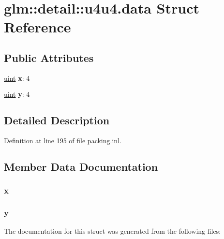 \hypertarget{structglm_1_1detail_1_1u4u4_8data}{}\section{glm\+:\+:detail\+:\+:u4u4.\+data Struct Reference}
\label{structglm_1_1detail_1_1u4u4_8data}
\subsection*{Public Attributes}
\begin{DoxyCompactItemize}
\item 
\mbox{\label{structglm_1_1detail_1_1u4u4_8data_a9dd4e461268c8034f5c8564e155c67a6}} 
\hyperlink{group__core__precision_ga4fd29415871152bfb5abd588334147c8}{uint} {\bfseries x}\+: 4
\item 
\mbox{\label{structglm_1_1detail_1_1u4u4_8data_a415290769594460e2e485922904f345d}} 
\hyperlink{group__core__precision_ga4fd29415871152bfb5abd588334147c8}{uint} {\bfseries y}\+: 4
\end{DoxyCompactItemize}


\subsection{Detailed Description}


Definition at line 195 of file packing.\+inl.



\subsection{Member Data Documentation}
\mbox{\label{structglm_1_1detail_1_1u4u4_8data_a9dd4e461268c8034f5c8564e155c67a6}} 
\subsubsection{\texorpdfstring{x}{x}}
{\footnotesize\ttfamily }

\mbox{\label{structglm_1_1detail_1_1u4u4_8data_a415290769594460e2e485922904f345d}} 
\subsubsection{\texorpdfstring{y}{y}}
{\footnotesize\ttfamily }



The documentation for this struct was generated from the following files\+: